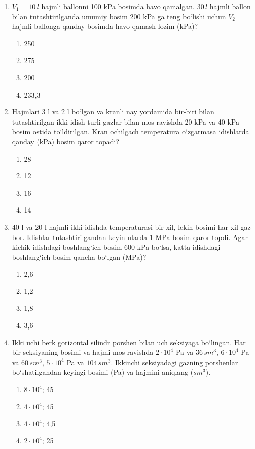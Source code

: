 \begin{enumerate}
\begin{tikzpicture}[>=stealth, scale=1]
\end{tikzpicture}

\begin{enumerate}[label=\Alph*)]
\item 1
\item 3
\item 2
\item barchasi bir xil
\end{enumerate}

\item $V_1 = 10 \, l$ hajmli ballonni 100 kPa bosimda havo qamalgan. $30 \, l$ hajmli ballon bilan tutashtirilganda umumiy bosim 200 kPa ga teng bo‘lishi uchun $V_2$ hajmli ballonga qanday bosimda havo qamash lozim (kPa)?
\begin{enumerate}[label=\Alph*)]
\item 250
\item 275
\item 200
\item 233,3
\end{enumerate}

\item Hajmlari 3 l va 2 l bo‘lgan va kranli nay yordamida bir-biri bilan tutashtirilgan ikki idish turli gazlar bilan mos ravishda 20 kPa va 40 kPa bosim ostida to‘ldirilgan. Kran ochilgach temperatura o‘zgarmasa idishlarda qanday (kPa) bosim qaror topadi?
\begin{enumerate}[label=\Alph*)]
\item 28
\item 12
\item 16
\item 14
\end{enumerate}

\item 40 l va 20 l hajmli ikki idishda temperaturasi bir xil, lekin bosimi har xil gaz bor. Idishlar tutashtirilgandan keyin ularda 1 MPa bosim qaror topdi. Agar kichik idishdagi boshlang‘ich bosim 600 kPa bo‘lsa, katta idishdagi boshlang‘ich bosim qancha bo‘lgan (MPa)?
\begin{enumerate}[label=\Alph*)]
\item 2,6
\item 1,2
\item 1,8
\item 3,6
\end{enumerate}

\item Ikki uchi berk gorizontal silindr porshen bilan uch seksiyaga bo‘lingan. Har bir seksiyaning bosimi va hajmi mos ravishda $2 \cdot 10^4$ Pa va $36 \, sm^3$, $6 \cdot 10^4$ Pa va $60 \, sm^3$, $5 \cdot 10^4$ Pa va $104 \, sm^3$. Ikkinchi seksiyadagi gazning porshenlar bo‘shatilgandan keyingi bosimi (Pa) va hajmini aniqlang ($sm^3$).
\begin{enumerate}[label=\Alph*)]
\item $8 \cdot 10^4$; 45
\item $4 \cdot 10^4$; 45
\item $4 \cdot 10^4$; 4,5
\item $2 \cdot 10^4$; 25
\end{enumerate}


\end{enumerate}
